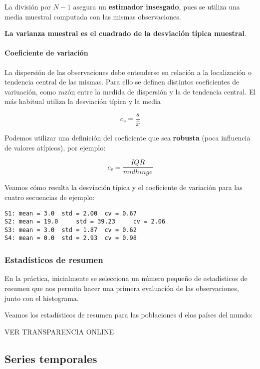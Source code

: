 \documentclass[11pt]{article}
\begin{document}
La división por \(N-1\) asegura un \textbf{estimador insesgado}, pues se
utiliza una media muestral computada con las mismas observaciones.

\textbf{La varianza muestral es el cuadrado de la desviación típica
muestral}.

    \paragraph{Coeficiente de variación}\label{coeficiente-de-variaciuxf3n}

La dispersión de las observaciones debe entenderse en relación a la
localización o tendencia central de las mismas. Para ello se definen
distintos coeficientes de variuación, como razón entre la medida de
dispersión y la de tendencia central. El más habitual utiliza la
desviación típica y la media

\[c_v = \frac{s}{\hat x}\]

Podemos utilizar una definición del coeficiente que sea \textbf{robusta}
(poca influencia de valores atípicos), por ejemplo:

\[c_v = \frac{IQR}{midhinge}\]

    Veamos cómo resulta la desviación típica y el coeficiente de variación
para las cuatro secuencias de ejemplo:

    \begin{Verbatim}[commandchars=\\\{\}]
S1:	mean = 3.0 	std = 2.00 	cv = 0.67
S2:	mean = 19.0 	std = 39.23 	cv = 2.06
S3:	mean = 3.0 	std = 1.87 	cv = 0.62
S4:	mean = 0.0 	std = 2.93 	cv = 0.98

    \end{Verbatim}

    \subsubsection*{Estadísticos de
resumen}\label{estaduxedsticos-de-resumen}

En la práctica, inicialmente se selecciona un número pequeño de
estadísticos de resumen que nos permita hacer una primera evaluación de
las observaciones, junto con el histograma.

Veamos los estadísticos de resumen para las poblaciones d elos países
del mundo:

VER TRANSPARENCIA ONLINE
            
    \subsection*{Series temporales}\label{series-temporales}
\end{document}
